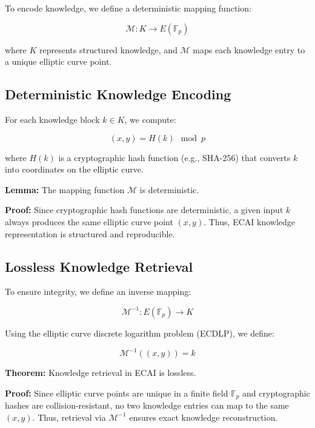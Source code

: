 \documentclass{article}
\begin{document}
To encode knowledge, we define a deterministic mapping function:

\begin{equation}
\mathcal{M}: K \to E(\mathbb{F}_p)
\end{equation}

where $K$ represents structured knowledge, and $\mathcal{M}$ maps each knowledge entry to a unique elliptic curve point.

\subsection{Deterministic Knowledge Encoding}

For each knowledge block $k \in K$, we compute:

\begin{equation}
(x, y) = H(k) \mod p
\end{equation}

where $H(k)$ is a cryptographic hash function (e.g., SHA-256) that converts $k$ into coordinates on the elliptic curve.

\textbf{Lemma:} The mapping function $\mathcal{M}$ is deterministic.

\textbf{Proof:} Since cryptographic hash functions are deterministic, a given input $k$ always produces the same elliptic curve point $(x, y)$. Thus, ECAI knowledge representation is structured and reproducible.

\subsection{Lossless Knowledge Retrieval}

To ensure integrity, we define an inverse mapping:

\begin{equation}
\mathcal{M}^{-1}: E(\mathbb{F}_p) \to K
\end{equation}

Using the elliptic curve discrete logarithm problem (ECDLP), we define:

\begin{equation}
\mathcal{M}^{-1}((x, y)) = k
\end{equation}

\textbf{Theorem:} Knowledge retrieval in ECAI is lossless.

\textbf{Proof:} Since elliptic curve points are unique in a finite field $\mathbb{F}_p$ and cryptographic hashes are collision-resistant, no two knowledge entries can map to the same $(x, y)$. Thus, retrieval via $\mathcal{M}^{-1}$ ensures exact knowledge reconstruction.
\end{document}
